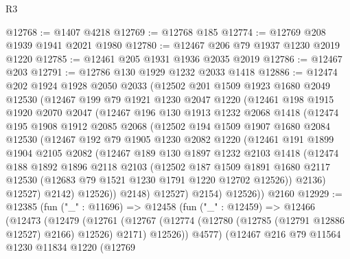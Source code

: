\begin{lexlean}{R3}
\begin{coremodule}
@12768 := @1407 @4218
@12769 := @12768 @185
@12774 := @12769 @208 @1939 @1941 @2021 @1980
@12780 := @12467 @206 @79 @1937 @1230 @2019 @1220
@12785 := @12461 @205 @1931 @1936 @2035 @2019
@12786 := @12467 @203
@12791 := @12786 @130 @1929 @1232 @2033 @1418
@12886 := @12474
    @202
    @1924
    @1928
    @2050
    @2033
    (@12502
      @201
      @1509
      @1923
      @1680
      @2049
      @12530
      (@12467
        @199
        @79
        @1921
        @1230
        @2047
        @1220
        (@12461
          @198
          @1915
          @1920
          @2070
          @2047
          (@12467
            @196
            @130
            @1913
            @1232
            @2068
            @1418
            (@12474
              @195
              @1908
              @1912
              @2085
              @2068
              (@12502
                @194
                @1509
                @1907
                @1680
                @2084
                @12530
                (@12467
                  @192
                  @79
                  @1905
                  @1230
                  @2082
                  @1220
                  (@12461
                    @191
                    @1899
                    @1904
                    @2105
                    @2082
                    (@12467
                      @189
                      @130
                      @1897
                      @1232
                      @2103
                      @1418
                      (@12474
                        @188
                        @1892
                        @1896
                        @2118
                        @2103
                        (@12502
                          @187
                          @1509
                          @1891
                          @1680
                          @2117
                          @12530
                          (@12683 @79 @1521 @1230 @1791 @1220 @12702 @12526))
                        @2136)
                      @12527)
                    @2142)
                  @12526))
              @2148)
            @12527)
          @2154)
        @12526))
    @2160
@12929 := @12385
    (fun ("_" : @11696) =>
    @12458
      (fun ("_" : @12459) =>
      @12466
        (@12473
          (@12479
            (@12761
              (@12767 (@12774 (@12780 (@12785 (@12791 @12886 @12527) @2166) @12526) @2171) @12526))
            @4577)
          (@12467
            @216
            @79
            @11564
            @1230
            @11834
            @1220
            (@12769

\end{coremodule}
\end{lexlean}
